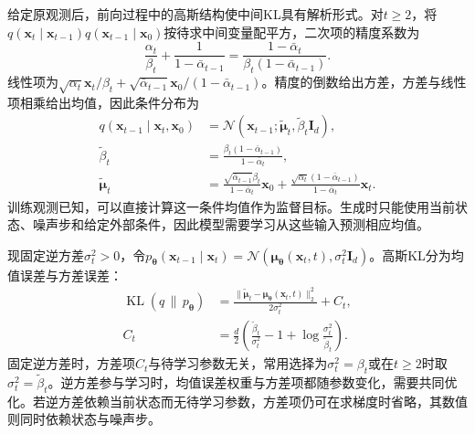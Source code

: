 给定原观测后，前向过程中的高斯结构使中间KL具有解析形式。对$t\geq2$，将$q(\bm{x}_t\mid\bm{x}_{t-1})q(\bm{x}_{t-1}\mid\bm{x}_0)$按待求中间变量配平方，二次项的精度系数为
\[
  \frac{\alpha_t}{\beta_t}
    +\frac{1}{1-\bar{\alpha}_{t-1}}
  =\frac{1-\bar{\alpha}_t}
          {\beta_t(1-\bar{\alpha}_{t-1})}.
\]
线性项为$\sqrt{\alpha_t}\bm{x}_t/\beta_t+\sqrt{\bar{\alpha}_{t-1}}\bm{x}_0/(1-\bar{\alpha}_{t-1})$。精度的倒数给出方差，方差与线性项相乘给出均值，因此条件分布为
\begin{equation}
  \label{eq:pgm-generative-forward-posterior}
  \begin{aligned}
    q(\bm{x}_{t-1}\mid\bm{x}_t,\bm{x}_0)
      &=\mathcal{N}(\bm{x}_{t-1};
          \widetilde{\bm{\mu}}_t,\widetilde{\beta}_t\bm{I}_d),\\
    \widetilde{\beta}_t
      &=\frac{\beta_t(1-\bar{\alpha}_{t-1})}
              {1-\bar{\alpha}_t},\\
    \widetilde{\bm{\mu}}_t
      &=\frac{\sqrt{\bar{\alpha}_{t-1}}\beta_t}
               {1-\bar{\alpha}_t}\bm{x}_0
       +\frac{\sqrt{\alpha_t}(1-\bar{\alpha}_{t-1})}
               {1-\bar{\alpha}_t}\bm{x}_t.
  \end{aligned}
\end{equation}
训练观测已知，可以直接计算这一条件均值作为监督目标。生成时只能使用当前状态、噪声步和给定外部条件，因此模型需要学习从这些输入预测相应均值。

现固定逆方差$\sigma_t^2>0$，令$p_{\bm{\theta}}(\bm{x}_{t-1}\mid\bm{x}_t)=\mathcal{N}(\bm{\mu}_{\bm{\theta}}(\bm{x}_t,t),\sigma_t^2\bm{I}_d)$。高斯KL分为均值误差与方差误差：
\begin{equation}
  \label{eq:pgm-generative-gaussian-step-kl}
  \begin{aligned}
    \operatorname{KL}(q\,\|\,p_{\bm{\theta}})
      &=\frac{\lVert\widetilde{\bm{\mu}}_t
                    -\bm{\mu}_{\bm{\theta}}(\bm{x}_t,t)\rVert_2^2}
               {2\sigma_t^2}+C_t,\\
    C_t&=\frac{d}{2}
       \left(\frac{\widetilde{\beta}_t}{\sigma_t^2}
              -1+\log\frac{\sigma_t^2}{\widetilde{\beta}_t}\right).
  \end{aligned}
\end{equation}
固定逆方差时，方差项$C_t$与待学习参数无关，常用选择为$\sigma_t^2=\beta_t$或在$t\geq2$时取$\sigma_t^2=\widetilde{\beta}_t$。逆方差参与学习时，均值误差权重与方差项都随参数变化，需要共同优化。若逆方差依赖当前状态而无待学习参数，方差项仍可在求梯度时省略，其数值则同时依赖状态与噪声步。

